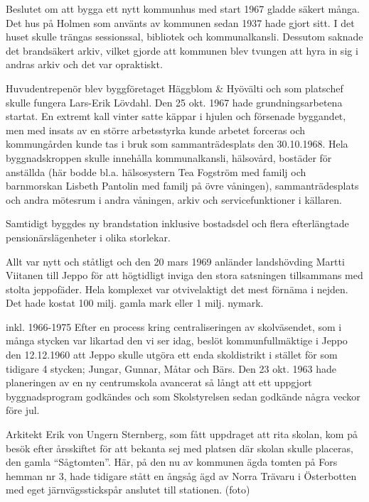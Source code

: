 Beslutet om att bygga ett nytt kommunhus med start 1967 gladde säkert många. Det hus på Holmen som använts av kommunen sedan 1937 hade gjort sitt. I det huset skulle trängas sessionssal, bibliotek och kommunalkansli. Dessutom saknade det brandsäkert arkiv, vilket gjorde att kommunen blev tvungen att hyra in sig i andras arkiv och det var opraktiskt.


Huvudentrepenör blev byggföretaget Häggblom \& Hyövälti och som platschef skulle fungera Lars-Erik Lövdahl. Den 25 okt. 1967 hade grundningsarbetena startat. En extremt kall vinter satte käppar i hjulen och försenade byggandet, men med insats av en större arbetsstyrka kunde arbetet forceras och kommungården kunde tas i bruk som sammanträdesplats den 30.10.1968. Hela byggnadskroppen skulle innehålla kommunalkansli, hälsovård, bostäder för anställda (här bodde bl.a. hälsosystern Tea Fogström med familj och barnmorskan Lisbeth Pantolin med familj på övre våningen), sammanträdesplats och andra mötesrum i andra våningen, arkiv och servicefunktioner i källaren.

Samtidigt byggdes ny brandstation inklusive bostadsdel och flera efterlängtade pensionärslägenheter i olika storlekar.

Allt var nytt och ståtligt och den 20 mars 1969 anländer landshövding Martti Viitanen till Jeppo för att högtidligt inviga den stora satsningen tillsammans med stolta jeppofäder. Hela komplexet var otvivelaktigt det mest förnäma i nejden. Det hade kostat 100 milj. gamla mark eller 1 milj. nymark.




 inkl.  1966-1975
Efter en process kring centraliseringen av skolväsendet, som i många stycken var likartad den vi ser idag, beslöt kommunfullmäktige i Jeppo den 12.12.1960 att Jeppo skulle utgöra ett enda skoldistrikt i stället för som tidigare 4 stycken; Jungar, Gunnar, Måtar och Bärs. Den 23 okt. 1963 hade planeringen av en ny centrumskola avancerat så långt att ett uppgjort byggnadsprogram godkändes och som Skolstyrelsen sedan godkände några veckor före jul.


Arkitekt Erik von Ungern Sternberg, som fått uppdraget att rita skolan, kom på besök efter årsskiftet för att bekanta sej med platsen där skolan skulle placeras, den gamla ``Sågtomten''. Här, på den nu av kommunen ägda tomten på Fors hemman nr 3, hade tidigare stått en ångsåg ägd av Norra Trävaru i Österbotten med eget järnvägsstickspår anslutet till stationen. (foto)

